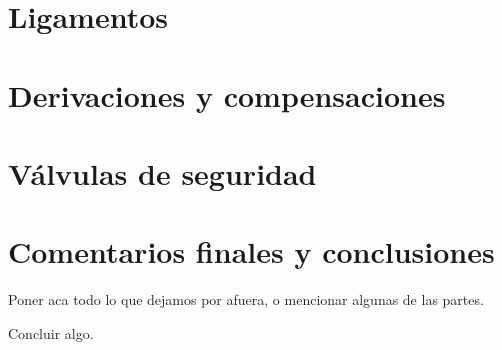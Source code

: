 \newpage
\section{Ligamentos}

\newpage
\section{Derivaciones y compensaciones}

\newpage
\section{Válvulas de seguridad}

\newpage
\section{Comentarios finales y conclusiones}

Poner aca todo lo que dejamos por afuera, o mencionar algunas de las partes.

Concluir algo.























